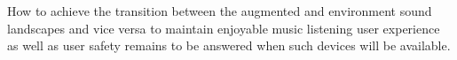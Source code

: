 \documentclass[manuscript,screen]{acmart}
\begin{document}
How to achieve the transition between the augmented and environment sound landscapes and vice versa to maintain enjoyable music listening user experience as well as user safety remains to be answered when such devices will be available. 






\end{document}
